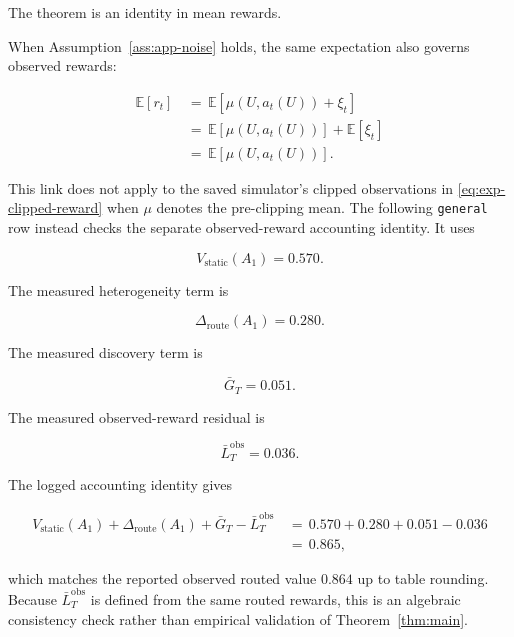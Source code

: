 \documentclass{article} %
\begin{document}
The theorem is an identity in mean rewards.

When Assumption~\ref{ass:app-noise} holds, the same expectation also governs
observed rewards:

\begin{align}
\label{eq:app-observed-mean-link}
\mathbb{E}[r_t]
&\,=\,
\mathbb{E}[\mu(U,a_t(U))+\xi_t]
\\
&\,=\,
\mathbb{E}[\mu(U,a_t(U))]
+
\mathbb{E}[\xi_t]
\\
&\,=\,
\mathbb{E}[\mu(U,a_t(U))].
\end{align}

This link does not apply to the saved simulator's clipped observations in
\eqref{eq:exp-clipped-reward} when \(\mu\) denotes the pre-clipping mean.
The following \texttt{general} row instead checks the separate observed-reward
accounting identity. It uses

\begin{equation}
\label{eq:app-numeric-static}
V_{\mathrm{static}}(A_1)=0.570.
\end{equation}

The measured heterogeneity term is

\begin{equation}
\label{eq:app-numeric-het}
\Delta_{\mathrm{route}}(A_1)=0.280.
\end{equation}

The measured discovery term is

\begin{equation}
\label{eq:app-numeric-discovery}
\bar G_T=0.051.
\end{equation}

The measured observed-reward residual is

\begin{equation}
\label{eq:app-numeric-tax}
\bar L_T^{\mathrm{obs}}=0.036.
\end{equation}

The logged accounting identity gives

\begin{align}
\label{eq:app-numeric-closure}
V_{\mathrm{static}}(A_1)
+
\Delta_{\mathrm{route}}(A_1)
+
\bar G_T
-
\bar L_T^{\mathrm{obs}}
&\,=\,
0.570+0.280+0.051-0.036
\\
&\,=\,
0.865,
\end{align}

which matches the reported observed routed value \(0.864\) up to table
rounding. Because \(\bar L_T^{\mathrm{obs}}\) is defined from the same routed
rewards, this is an algebraic consistency check rather than empirical
validation of Theorem~\ref{thm:main}.
\end{document}
